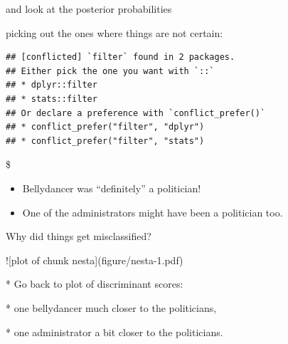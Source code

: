 \documentclass[ignorenonframetext,]{beamer}
\newenvironment{Shaded}{\begin{snugshade}}{\end{snugshade}}
\newcommand{\DataTypeTok}[1]{\textcolor[rgb]{0.13,0.29,0.53}{#1}}
\newcommand{\DecValTok}[1]{\textcolor[rgb]{0.00,0.00,0.81}{#1}}
\newcommand{\FloatTok}[1]{\textcolor[rgb]{0.00,0.00,0.81}{#1}}
\newcommand{\KeywordTok}[1]{\textcolor[rgb]{0.13,0.29,0.53}{\textbf{#1}}}
\newcommand{\NormalTok}[1]{#1}
\newcommand{\OperatorTok}[1]{\textcolor[rgb]{0.81,0.36,0.00}{\textbf{#1}}}
\newcommand{\StringTok}[1]{\textcolor[rgb]{0.31,0.60,0.02}{#1}}
\begin{document}
\begin{frame}[fragile]{and look at the posterior probabilities}
\protect\hypertarget{and-look-at-the-posterior-probabilities}{}

picking out the ones where things are not certain:

\begin{Shaded}
\end{Shaded}

\begin{verbatim}
## [conflicted] `filter` found in 2 packages.
## Either pick the one you want with `::` 
## * dplyr::filter
## * stats::filter
## Or declare a preference with `conflict_prefer()`
## * conflict_prefer("filter", "dplyr")
## * conflict_prefer("filter", "stats")
\end{verbatim}

\$

\begin{itemize}
\item
  Bellydancer was ``definitely'' a politician!
\item
  One of the administrators might have been a politician too.
\end{itemize}

\end{frame}

\begin{frame}{Why did things get misclassified?}
\protect\hypertarget{why-did-things-get-misclassified}{}

\begin{minipage}[t]{0.7\linewidth}
![plot of chunk nesta](figure/nesta-1.pdf)

       
\end{minipage}
\begin{minipage}[t]{0.28\linewidth}


* Go back to plot of discriminant scores:

* one bellydancer much closer to the politicians,

* one administrator a bit closer to the politicians.

\end{minipage}

\end{frame}
\end{document}

